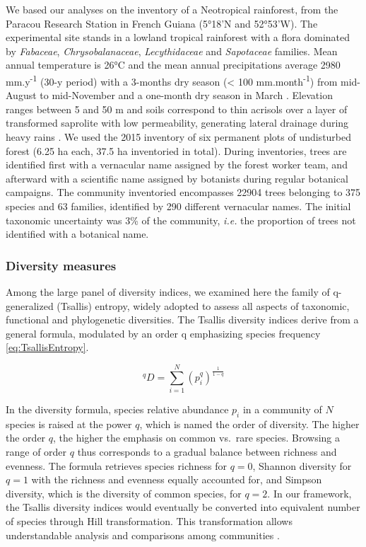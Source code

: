 \documentclass[
  11pt,
  french,
  A4paper,
  extrafontsizes,onecolumn,openright
  ]{memoir}
\begin{document}
We based our analyses on the inventory of a Neotropical rainforest, from
the Paracou Research Station in French Guiana (5°18'N and 52°53'W). The
experimental site stands in a lowland tropical rainforest with a flora
dominated by \emph{Fabaceae}, \emph{Chrysobalanaceae},
\emph{Lecythidaceae} and \emph{Sapotaceae} families. Mean annual
temperature is 26°C and the mean annual precipitations average 2980
mm.y\textsuperscript{-1} (30-y period) with a 3-months dry season
(\textless{} 100 mm.month\textsuperscript{-1}) from mid-August to
mid-November and a one-month dry season in March \autocite{Wagner2011}.
Elevation ranges between 5 and 50 m and soils correspond to thin
acrisols over a layer of transformed saprolite with low permeability,
generating lateral drainage during heavy rains
\autocite{IUSSWorkingGroupWRB2015}. We used the 2015 inventory of six
permanent plots of undisturbed forest (6.25 ha each, 37.5 ha inventoried
in total). During inventories, trees are identified first with a
vernacular name assigned by the forest worker team, and afterward with a
scientific name assigned by botanists during regular botanical
campaigns. The community inventoried encompasses 22904 trees belonging
to 375 species and 63 families, identified by 290 different vernacular
names. The initial taxonomic uncertainty was 3\% of the community,
\emph{i.e.} the proportion of trees not identified with a botanical
name.

\subsubsection{Diversity measures}\label{diversity-measures}

Among the large panel of diversity indices, we examined here the family
of q-generalized (Tsallis) entropy, widely adopted to assess all aspects
of taxonomic, functional and phylogenetic diversities. The Tsallis
diversity indices derive from a general formula, modulated by an order q
emphasizing species frequency \eqref{eq:TsallisEntropy}.

\begin{equation}
^qD = \sum_{i=1}^{N}{\left( p_i^q \right)^{\frac{1}{1-q}} }
\label{eq:TsallisEntropy}
\end{equation}

In the diversity formula, species relative abundance \(p_i\) in a
community of \(N\) species is raised at the power \(q\), which is named
the order of diversity. The higher the order \(q\), the higher the
emphasis on common vs.~rare species. Browsing a range of order \(q\)
thus corresponds to a gradual balance between richness and evenness. The
formula retrieves species richness for \(q = 0\), Shannon diversity for
\(q = 1\) with the richness and evenness equally accounted for, and
Simpson diversity, which is the diversity of common species, for
\(q = 2\). In our framework, the Tsallis diversity indices would
eventually be converted into equivalent number of species through Hill
transformation. This transformation allows understandable analysis and
comparisons among communities
\autocites{Hill1973}{Keylock2005}{Jost2006}.
\end{document}
